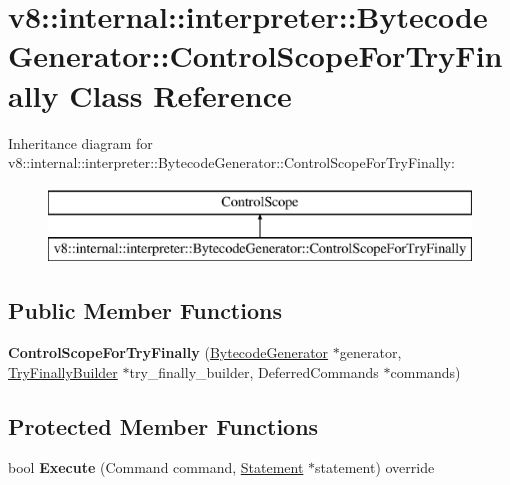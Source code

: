 \hypertarget{classv8_1_1internal_1_1interpreter_1_1_bytecode_generator_1_1_control_scope_for_try_finally}{}\section{v8\+:\+:internal\+:\+:interpreter\+:\+:Bytecode\+Generator\+:\+:Control\+Scope\+For\+Try\+Finally Class Reference}
\label{classv8_1_1internal_1_1interpreter_1_1_bytecode_generator_1_1_control_scope_for_try_finally}
Inheritance diagram for v8\+:\+:internal\+:\+:interpreter\+:\+:Bytecode\+Generator\+:\+:Control\+Scope\+For\+Try\+Finally\+:\begin{figure}[H]
\begin{center}
\leavevmode
\includegraphics[height=2.000000cm]{classv8_1_1internal_1_1interpreter_1_1_bytecode_generator_1_1_control_scope_for_try_finally}
\end{center}
\end{figure}
\subsection*{Public Member Functions}
\begin{DoxyCompactItemize}
\item 
{\bfseries Control\+Scope\+For\+Try\+Finally} (\hyperlink{classv8_1_1internal_1_1interpreter_1_1_bytecode_generator}{Bytecode\+Generator} $\ast$generator, \hyperlink{classv8_1_1internal_1_1interpreter_1_1_try_finally_builder}{Try\+Finally\+Builder} $\ast$try\+\_\+finally\+\_\+builder, Deferred\+Commands $\ast$commands)\hypertarget{classv8_1_1internal_1_1interpreter_1_1_bytecode_generator_1_1_control_scope_for_try_finally_adc24d88d09c5a3ba5db739c5ea72c5df}{}\label{classv8_1_1internal_1_1interpreter_1_1_bytecode_generator_1_1_control_scope_for_try_finally_adc24d88d09c5a3ba5db739c5ea72c5df}

\end{DoxyCompactItemize}
\subsection*{Protected Member Functions}
\begin{DoxyCompactItemize}
\item 
bool {\bfseries Execute} (Command command, \hyperlink{classv8_1_1internal_1_1_statement}{Statement} $\ast$statement) override\hypertarget{classv8_1_1internal_1_1interpreter_1_1_bytecode_generator_1_1_control_scope_for_try_finally_a17b444398950064a7dbb8734b12cf6ec}{}\label{classv8_1_1internal_1_1interpreter_1_1_bytecode_generator_1_1_control_scope_for_try_finally_a17b444398950064a7dbb8734b12cf6ec}

\end{DoxyCompactItemize}
